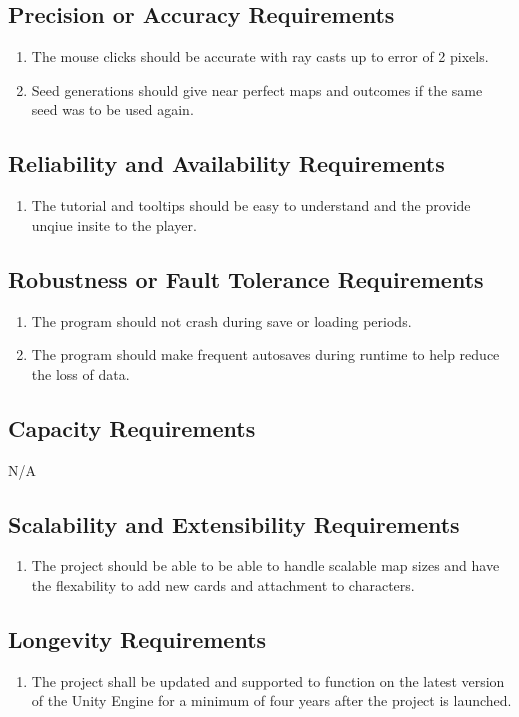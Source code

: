 \documentclass{article}
\begin{document}
\subsection{Precision or Accuracy Requirements}
\begin{enumerate}[{PAR}1. ]
	\item The mouse clicks should be accurate with ray casts up to error of 2 pixels.
	\item Seed generations should give near perfect maps and outcomes if the same seed was to be used again.
\end{enumerate}
\subsection{Reliability and Availability Requirements}
\begin{enumerate}[{RAR}1. ]
	\item The tutorial and tooltips should be easy to understand and the provide unqiue insite to the player.
\end{enumerate}
\subsection{Robustness or Fault Tolerance Requirements}
\begin{enumerate}[{RFR}1. ]
	\item The program should not crash during save or loading periods.
	\item The program should make frequent autosaves during runtime to help reduce the loss of data.
\end{enumerate}
\subsection{Capacity Requirements}
\quad N/A
\subsection{Scalability and Extensibility Requirements}
\begin{enumerate}[{SER}1. ]
	\item The project should be able to be able to handle scalable map sizes and have the flexability to add new cards and attachment to characters.
\end{enumerate}
\subsection{Longevity Requirements}
\begin{enumerate}[{LR}1. ]
	\item The project shall be updated and supported to function on the latest version of the Unity Engine for a minimum of four years after the project is launched.
\end{enumerate}
\end{document}
